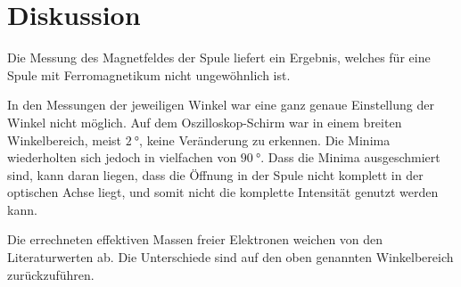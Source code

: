 \section{Diskussion}
\label{sec:Diskussion}
Die Messung des Magnetfeldes der Spule liefert ein Ergebnis,
welches für eine Spule mit Ferromagnetikum nicht ungewöhnlich ist.

In den Messungen der jeweiligen Winkel war eine ganz genaue Einstellung
der Winkel nicht möglich.
Auf dem Oszilloskop-Schirm war in einem breiten Winkelbereich,
meist $\SI{2}{\degree}$, keine Veränderung zu erkennen.
Die Minima wiederholten sich jedoch in vielfachen von $\SI{90}{\degree}$.
Dass die Minima ausgeschmiert sind, kann daran liegen, dass die Öffnung
in der Spule nicht komplett in der optischen Achse liegt, und somit nicht die
komplette Intensität genutzt werden kann.

Die errechneten effektiven Massen freier Elektronen weichen von den Literaturwerten ab.
Die Unterschiede sind auf den oben genannten Winkelbereich zurückzuführen.